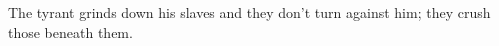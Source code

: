 \documentclass[MAIN]{subfiles}
\begin{document}
The tyrant grinds down his slaves and they don't turn against him; they crush those beneath them.
\end{document}
